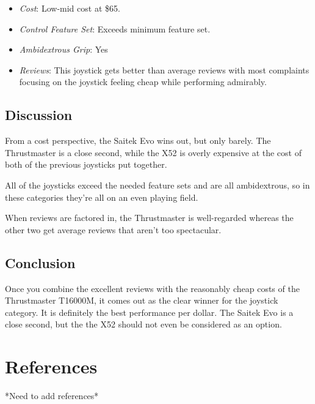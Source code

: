 \documentclass[onecolumn, draftclsnofoot, 10pt, compsoc]{IEEEtran}
\begin{document}
\begin{itemize}
\item \textit{Cost}: Low-mid cost at \$65.
\item \textit{Control Feature Set}: Exceeds minimum feature set.
\item \textit{Ambidextrous Grip}: Yes
\item \textit{Reviews}: This joystick gets better than average reviews with most complaints focusing on the joystick feeling cheap while performing admirably.
\end{itemize}

\subsection{Discussion}
From a cost perspective, the Saitek Evo wins out, but only barely. The Thrustmaster is a close second, while the X52 is overly expensive at the cost of both of the previous joysticks put together. 

All of the joysticks exceed the needed feature sets and are all ambidextrous, so in these categories they're all on an even playing field.

When reviews are factored in, the Thrustmaster is well-regarded whereas the other two get average reviews that aren't too spectacular.

\subsection{Conclusion}
Once you combine the excellent reviews with the reasonably cheap costs of the Thrustmaster T16000M, it comes out as the clear winner for the joystick category. It is definitely the best performance per dollar. The Saitek Evo is a close second, but the the X52 should not even be considered as an option.

\section{References}
*Need to add references*
\end{document}
